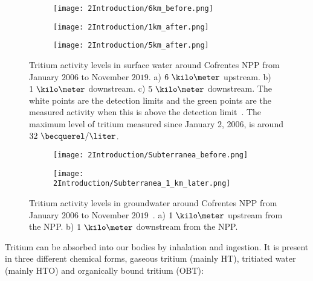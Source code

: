\begin{figure}
\centering
    \begin{subfigure}[b]{0.7\textwidth}
    \centering
    \texttt{[image: 2Introduction/6km\_before.png]}  
    \caption{\label{subfig:TritiumL6kB}}
    \end{subfigure}
    \hfill
    \begin{subfigure}[b]{0.7\textwidth}
    \centering
    \texttt{[image: 2Introduction/1km\_after.png]}  
    \caption{\label{subfig:TritiumL1kA}}
    \end{subfigure}
    \hfill
    \begin{subfigure}[b]{0.7\textwidth}
    \centering
    \texttt{[image: 2Introduction/5km\_after.png]}  
    \caption{\label{subfig:TritiumL5kA}}
    \end{subfigure}
 \caption{Tritium activity levels in surface water around Cofrentes NPP from January $2006$ to November $2019$. a) $6~\kilo\meter$ upstream. b) $1~\kilo\meter$ downstream. c) $5~\kilo\meter$ downstream. The white points are the detection limits and the green points are the measured activity when this is above the detection limit~\cite{REM}. The maximum level of tritium measured since January 2, 2006, is around $32~\becquerel/\liter$.}
 \label{subfig:MeasurementsCofrentesSurface}
\end{figure}

\begin{figure}
\centering
    \begin{subfigure}[b]{0.9\textwidth}
    \centering
    \texttt{[image: 2Introduction/Subterranea\_before.png]}  
    \caption{\label{subfig:TritiumLG1kB}}
    \end{subfigure}
    \hfill
    \begin{subfigure}[b]{0.9\textwidth}
    \centering
    \texttt{[image: 2Introduction/Subterranea\_1\_km\_later.png]}  
    \caption{\label{subfig:TritiumLG1kA}}
    \end{subfigure}
 \caption{Tritium activity levels in groundwater around Cofrentes NPP from January $2006$ to November $2019$~\cite{REM}. a) $1~\kilo\meter$ upstream from the NPP. b) $1~\kilo\meter$ downstream from the NPP.}
 \label{fig:MeasurementsCofrentesGroundWater}
\end{figure}

Tritium can be absorbed into our bodies by inhalation and ingestion. It is present in three different chemical forms, gaseous tritium (mainly HT), tritiated water (mainly HTO) and organically bound tritium (OBT):

